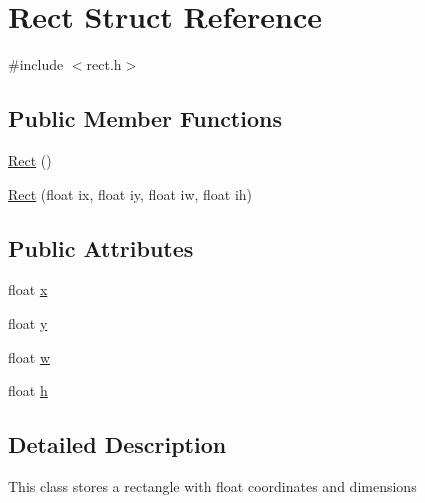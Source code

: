 \hypertarget{struct_rect}{\section{Rect Struct Reference}
\label{struct_rect}
}


{\ttfamily \#include $<$rect.\-h$>$}

\subsection*{Public Member Functions}
\begin{DoxyCompactItemize}
\item 
\hyperlink{struct_rect_a911e531b86de33734dd7de3456722115}{Rect} ()
\item 
\hyperlink{struct_rect_a5dfbf7d4b3227a527bbbf1fe999a3cd9}{Rect} (float ix, float iy, float iw, float ih)
\end{DoxyCompactItemize}
\subsection*{Public Attributes}
\begin{DoxyCompactItemize}
\item 
float \hyperlink{struct_rect_a29bc9b88a8c5537620f05ac7069f48cc}{x}
\item 
float \hyperlink{struct_rect_a4ea33d8210fa0b8b0d6ef3f7e06e6b27}{y}
\item 
float \hyperlink{struct_rect_a049f7ee5e7eb0475229bf3ed9b3bad44}{w}
\item 
float \hyperlink{struct_rect_aa10c9b8950c6b23a0b2bf0d39f2be904}{h}
\end{DoxyCompactItemize}


\subsection{Detailed Description}
This class stores a rectangle with float coordinates and dimensions 

